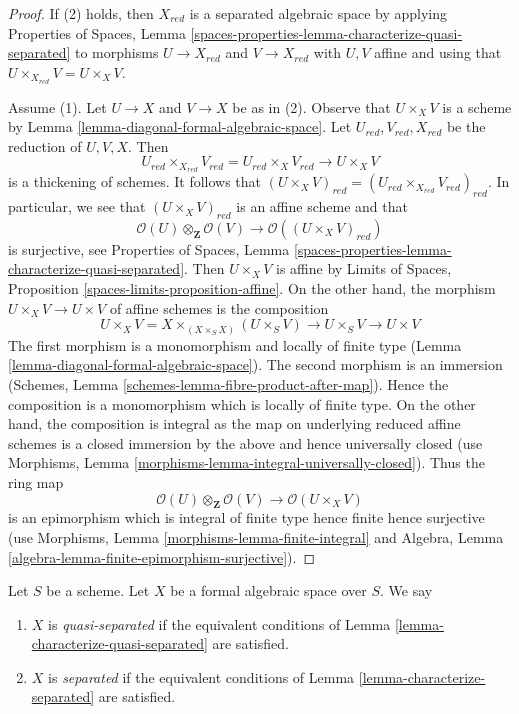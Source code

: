 \begin{proof}
If (2) holds, then $X_{red}$ is a separated algebraic space
by applying Properties of Spaces, Lemma
\ref{spaces-properties-lemma-characterize-quasi-separated}
to morphisms $U \to X_{red}$ and $V \to X_{red}$
with $U, V$ affine and using that $U \times_{X_{red}} V = U \times_X V$.

\medskip\noindent
Assume (1). Let $U \to X$ and $V \to X$ be as in (2).
Observe that $U \times_X V$ is a scheme by
Lemma \ref{lemma-diagonal-formal-algebraic-space}.
Let $U_{red}, V_{red}, X_{red}$ be the reduction of $U, V, X$.
Then
$$
U_{red} \times_{X_{red}} V_{red} = U_{red} \times_X V_{red} \to U \times_X V
$$
is a thickening of schemes. It follows that
$(U \times_X V)_{red} = (U_{red} \times_{X_{red}} V_{red})_{red}$.
In particular, we see that $(U \times_X V)_{red}$ is an affine scheme
and that
$$
\mathcal{O}(U) \otimes_\mathbf{Z} \mathcal{O}(V)
\longrightarrow
\mathcal{O}((U \times_X V)_{red})
$$
is surjective, see Properties of Spaces, Lemma
\ref{spaces-properties-lemma-characterize-quasi-separated}.
Then $U \times_X V$ is affine by
Limits of Spaces, Proposition \ref{spaces-limits-proposition-affine}.
On the other hand, the morphism $U \times_X V \to U \times V$
of affine schemes is the composition
$$
U \times_X V = X \times_{(X \times_S X)} (U \times_S V)
\to U \times_S V \to U \times V
$$
The first morphism is a monomorphism and locally of finite type
(Lemma \ref{lemma-diagonal-formal-algebraic-space}).
The second morphism is an immersion
(Schemes, Lemma \ref{schemes-lemma-fibre-product-after-map}).
Hence the composition is a monomorphism which is locally of finite type.
On the other hand, the composition is integral as the map on
underlying reduced affine schemes is a closed immersion
by the above and hence universally closed (use
Morphisms, Lemma \ref{morphisms-lemma-integral-universally-closed}).
Thus the ring map
$$
\mathcal{O}(U) \otimes_\mathbf{Z} \mathcal{O}(V)
\longrightarrow
\mathcal{O}(U \times_X V)
$$
is an epimorphism which is integral of finite type
hence finite hence surjective (use
Morphisms, Lemma \ref{morphisms-lemma-finite-integral}
and
Algebra, Lemma \ref{algebra-lemma-finite-epimorphism-surjective}).
\end{proof}

\begin{definition}
\label{definition-separated}
Let $S$ be a scheme. Let $X$ be a formal algebraic space over $S$.
We say
\begin{enumerate}
\item $X$ is {\it quasi-separated} if the equivalent conditions of
Lemma \ref{lemma-characterize-quasi-separated} are satisfied.
\item $X$ is {\it separated} if the equivalent conditions of
Lemma \ref{lemma-characterize-separated} are satisfied.
\end{enumerate}
\end{definition}


